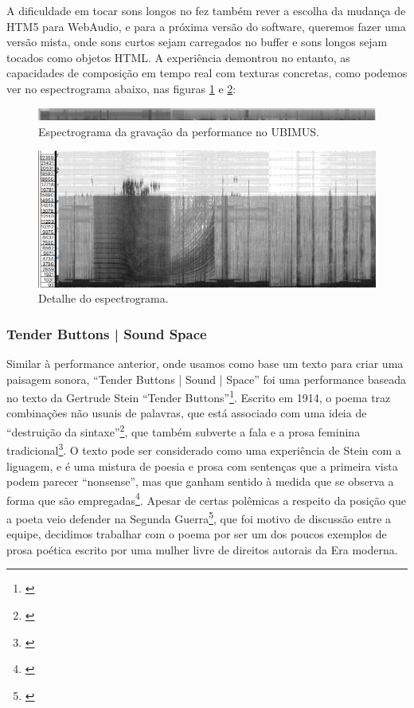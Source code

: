 A dificuldade em tocar sons longos no fez também rever a escolha da mudança de HTM5 para WebAudio, e para a próxima versão do software, queremos fazer uma versão mista, onde sons curtos sejam carregados no buffer e sons longos sejam tocados como objetos HTML. A experiência demontrou no entanto, as capacidades de composição em tempo real com texturas concretas, como podemos ver no espectrograma abaixo, nas figuras \ref{specubimus} e \ref{spceubimusdt}:

\begin{figure}

\includegraphics[width=1\linewidth]{pictures/cap4/canibalspec2}
\caption{Espectrograma da gravação da performance no UBIMUS.}
\label{specubimus}
\end{figure}

\begin{figure}

\includegraphics[width=1\linewidth]{pictures/cap4/canibalspecdbvdt}
\caption{Detalhe do espectrograma.}
\label{spceubimusdt}
\end{figure}

\subsubsection{Tender Buttons | Sound Space}
Similar à performance anterior, onde usamos como base um texto para criar uma paisagem sonora, ``Tender Buttons | Sound | Space''  foi uma performance baseada no texto da Gertrude Stein ``Tender Buttons''\footnote{\cite{Stein1914}}. Escrito em 1914, o poema traz combinações não usuais de palavras, que está associado com uma ideia de ``destruição da sintaxe''\footnote{\cite{Perloff1996}}, que também subverte a fala e a prosa feminina tradicional\footnote{\cite{Murphy1991}}. O texto pode ser considerado como uma experiência de Stein com a liguagem, e é uma mistura de poesia e prosa com sentenças que a primeira vista podem parecer ``nonsense'', mas que ganham sentido à medida que se observa a forma que são empregadas\footnote{\cite{Perloff1996}}. Apesar de certas polêmicas a respeito da posição que a poeta veio defender na Segunda Guerra\footnote{\cite{Bernstein2012}}, que foi motivo de discussão entre a equipe, decidimos trabalhar com o poema por ser um dos poucos exemplos de prosa poética escrito por uma mulher livre de direitos autorais da Era moderna.

